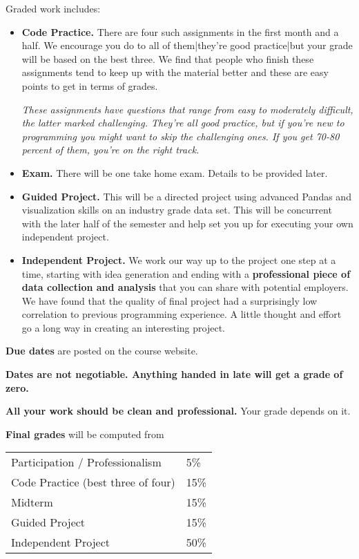Graded work includes:
\begin{itemize}

\item {\bf Code Practice.\/}
There are four such assignments in the first month and a half. We encourage you do to all of them|they're good practice|but your grade will be based on the best three. We find that people who finish these assignments tend to keep up with the material better and these are easy points to get in terms of grades.

{\it These assignments have questions that range from easy to moderately difficult,
the latter marked {\it challenging\/}.
They're all good practice, but if you're new to programming you
might want to skip the challenging ones.
If you get 70-80 percent of them, you're on the right track. \/}

\item {\bf Exam.\/}
There will be one take home exam. Details to be provided later.


\item {\bf Guided Project.\/}
This will be a directed project using advanced Pandas and visualization skills on an industry grade data set. This will be concurrent with the later half of the semester and help set you up for executing your own independent project.

\item {\bf Independent Project.\/}
We work our way up to the project one step at a time, starting with idea generation and ending
with a {\bf professional piece of data collection and analysis\/}
that you can share with potential employers. We have found that the quality
of final project had a surprisingly low correlation to previous programming experience. A little thought and
effort go a long way in creating an interesting project.

\end{itemize}


{\bf Due dates} are posted on the course website.

{\bf Dates are not negotiable.
Anything handed in late will get a grade of zero.\/}

{\bf All your work should be clean and professional.}  Your grade depends on it.

{\bf Final grades\/} will be computed from
\begin{center}
\begin{tabular}{ll}
Participation / Professionalism & 5\% \\
Code Practice (best three of four) & 15\% \\
Midterm       & 15\% \\
Guided Project        & 15\% \\
Independent Project     & 50\% \\
\end{tabular}
\end{center}

